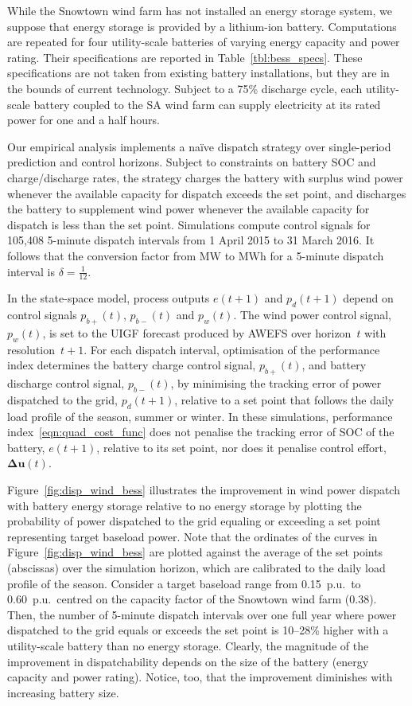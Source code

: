 \documentclass[3p,times,procedia]{elsarticle}
\def\mwmwh{\delta}
\begin{document}
While the Snowtown wind farm has not installed an energy storage system, we suppose that energy storage is provided by a lithium-ion battery.  Computations are repeated for four utility-scale batteries of varying energy capacity and power rating.  Their specifications are reported in Table~\ref{tbl:bess_specs}.  These specifications are not taken from existing battery installations, but they are in the bounds of current technology.  Subject to a 75\% discharge cycle, each utility-scale battery coupled to the SA wind farm can supply electricity at its rated power for one and a half hours.

Our empirical analysis implements a na\"ive dispatch strategy over single-period prediction and control horizons.  Subject to constraints on battery SOC and charge/discharge rates, the strategy charges the battery with surplus wind power whenever the available capacity for dispatch exceeds the set point, and discharges the battery to supplement wind power whenever the available capacity for dispatch is less than the set point.  Simulations compute control signals for 105,408 5-minute dispatch intervals from 1 April 2015 to 31 March 2016.  It follows that the conversion factor from MW to MWh for a 5-minute dispatch interval is $\mwmwh = \tfrac{1}{12}$.  

In the state-space model, process outputs $e(t\!+\!1)$ and $p_{d}(t\!+\!1)$ depend on control signals $p_{b+}(t)$, $p_{b-}(t)$ and $p_{w}(t)$.  The wind power control signal, $p_{w}(t)$, is set to the UIGF forecast produced by AWEFS over horizon~$t$ with resolution~$t\!+\!1$.  For each dispatch interval, optimisation of the performance index determines the battery charge control signal, $p_{b+}(t)$, and battery discharge control signal, $p_{b-}(t)$, by minimising the tracking error of power dispatched to the grid, $p_{d}(t\!+\!1)$, relative to a set point that follows the daily load profile of the season, summer or winter.  In these simulations, performance index~\eqref{eqn:quad_cost_func} does not penalise the tracking error of SOC of the battery, $e(t\!+\!1)$, relative to its set point, nor does it penalise control effort, $\boldsymbol{\Delta{u}}(t)$. 

Figure~\ref{fig:disp_wind_bess} illustrates the improvement in wind power dispatch with battery energy storage relative to no energy storage by plotting the probability of power dispatched to the grid equaling or exceeding a set point representing target baseload power.  Note that the ordinates of the curves in Figure~\ref{fig:disp_wind_bess} are plotted against the average of the set points (abscissas) over the simulation horizon, which are calibrated to the daily load profile of the season.  Consider a target baseload range from 0.15~p.u.\ to 0.60~p.u.\ centred on the capacity factor of the Snowtown wind farm (0.38).  Then, the number of 5-minute dispatch intervals over one full year where power dispatched to the grid equals or exceeds the set point is 10--28\% higher with a utility-scale battery than no energy storage.  Clearly, the magnitude of the improvement in dispatchability depends on the size of the battery (energy capacity and power rating).  Notice, too, that the improvement diminishes with increasing battery size.
\end{document}
